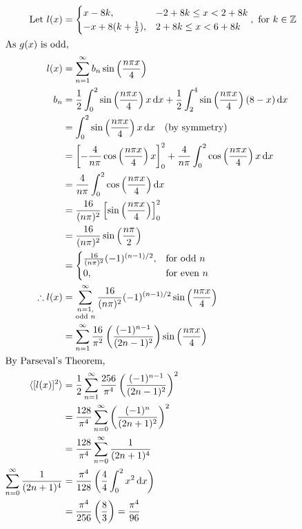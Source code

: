 \documentclass[12pt]{article}
\newcommand*\diff{\mathop{}\!\mathrm{d}}
\newcommand{\Z}{\mathbb{Z}}
\newenvironment{problem}[2][Problem]{\begin{trivlist}
\item[\hskip \labelsep {\bfseries #1}\hskip \labelsep {\bfseries #2.}]}{\end{trivlist}}
\begin{document}
\begin{problem}{1.b}
\end{problem}
\begin{align*}
	\text{Let } l(x) &= \begin{cases}
		x - 8k, & -2 + 8k \le x < 2 + 8k \\
		-x + 8(k+\frac{1}{2}), & 2 + 8k \le x < 6 + 8k \\
	\end{cases}, \text{ for $k \in \Z$} \\
	\intertext{As $g(x)$ is odd,}
	l(x) &= \sum_{n=1}^\infty b_n \sin \left( \frac{n\pi x}{4} \right) \\
	b_n &= \frac{1}{2} \int_0^2 \sin \left( \frac{n\pi x}{4} \right) x \diff x
		+ \frac{1}{2} \int_2^4 \sin \left( \frac{n\pi x}{4} \right) (8-x) \diff x \\
	&=  \int_0^2 \sin \left( \frac{n\pi x}{4} \right) x \diff x \quad
		(\text{by symmetry}) \\ 
	&=  \left[ -\frac{4}{n\pi} \cos \left( \frac{n\pi x}{4} \right) x
		\right]_0^2 + \frac{4}{n\pi} \int_0^2 \cos \left( \frac{n\pi x}{4}
		\right) x \diff x \\
	&=  \frac{4}{n\pi} \int_0^2 \cos \left( \frac{n\pi x}{4} \right) \diff x \\
	&=  \frac{16}{(n\pi)^2} \left[ \sin \left( \frac{n\pi x}{4} \right) \right]_0^2 \\
	&=  \frac{16}{(n\pi)^2} \sin \left( \frac{n\pi}{2} \right) \\
	&=  \begin{cases}
		\frac{16}{(n\pi)^2} (-1)^{(n-1)/2}, & \text{for odd $n$} \\
		0, & \text{for even $n$} \\
		\end{cases} \\
	\therefore l(x) &= \sum_{\substack{n=1,\\ \text{odd $n$}}}^\infty
		\frac{16}{(n\pi)^2} (-1)^{(n-1)/2} \sin \left( \frac{n\pi x}{4} \right) \\
	&= \sum_{n=1}^\infty \frac{16}{\pi^2} \left( \frac{(-1)^{n-1}}{(2n-1)^2}
		\right) \sin \left( \frac{n\pi x}{4} \right) \\
	\intertext{By Parseval's Theorem,}
	\langle [l(x)]^2 \rangle &= \frac{1}{2} \sum_{n=1}^\infty \frac{256}{\pi^4} \left(
		\frac{(-1)^{n-1}}{(2n-1)^2} \right)^2 \\
	&= \frac{128}{\pi^4} \sum_{n=0}^\infty \left( \frac{(-1)^{n}}{(2n+1)^2}
		\right)^2 \\
	&= \frac{128}{\pi^4} \sum_{n=0}^\infty \frac{1}{(2n+1)^4} \\
	\sum_{n=0}^\infty \frac{1}{(2n+1)^4} &= \frac{\pi^4}{128} \left(
		\frac{4}{4} \int_0^2 x^2 \diff x \right) \\
	&= \frac{\pi^4}{256} \left( \frac{8}{3} \right) = \frac{\pi^4}{96}
\end{align*}
\filbreak
\end{document}
